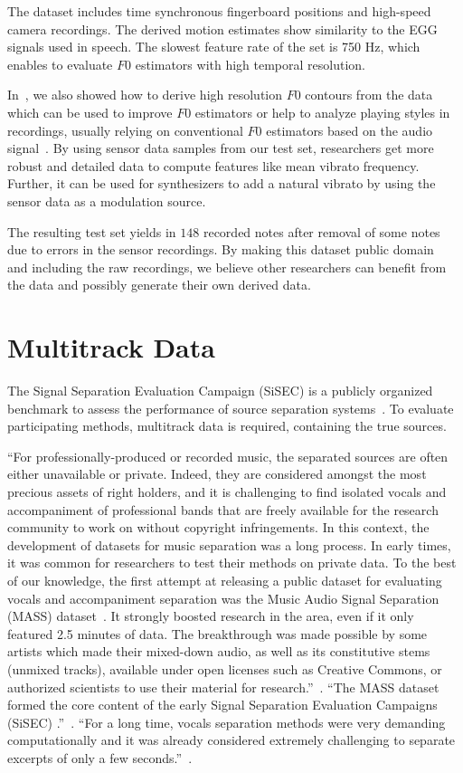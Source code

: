\par
The dataset includes time synchronous fingerboard positions and high-speed camera recordings. 
The derived motion estimates show similarity to the EGG signals used in speech. 
The slowest feature rate of the set is 750 Hz, which enables to evaluate $F0$ estimators with high temporal resolution. 
\par
In~\cite{stoeter15acm}, we also showed how to derive high resolution $F0$ contours from the data which can be used to improve $F0$ estimators or help to analyze playing styles in recordings, usually relying on conventional $F0$ estimators based on the audio signal~\cite{mellody2000time}. 
By using sensor data samples from our test set, researchers get more robust and detailed data to compute features like mean vibrato frequency. 
Further, it can be used for synthesizers to add a natural vibrato by using the sensor data as a modulation source.
\par
The resulting test set yields in $148$ recorded notes after removal of some notes due to errors in the sensor recordings.
By making this dataset public domain~\cite{oss_muserc} and including the raw recordings, we believe other researchers can benefit from the data and possibly generate their own derived data.

\section{Multitrack Data}%
\label{sec:multitrack}

The Signal Separation Evaluation Campaign (SiSEC) is a publicly organized benchmark to assess the performance of source separation systems~\cite{sisec13, ono15, liutkus17, stoeter18sisec}.
To evaluate participating methods, multitrack data is required, containing the true sources.

``For professionally-produced or recorded music, the separated sources are often either unavailable or private. Indeed, they are considered amongst the most precious assets of right holders, and it is challenging to find isolated vocals and accompaniment of professional bands that are freely available for the research community to work on without copyright infringements.
In this context, the development of datasets for music separation was a long process. 
In early times, it was common for researchers to test their methods on private data. 
To the best of our knowledge, the first attempt at releasing a public dataset for evaluating vocals and accompaniment separation was the Music Audio Signal Separation (MASS) dataset~\cite{MTGMASSdb}.
It strongly boosted research in the area, even if it only featured 2.5 minutes of data. The breakthrough was made possible by some artists which made their mixed-down audio, as well as its constitutive stems (unmixed tracks), available under open licenses such as Creative Commons, or authorized scientists to use their material for research.''~\cite{rafii}.
% 
``The MASS dataset formed the core content of the early Signal Separation Evaluation Campaigns (SiSEC) \cite{vincent09}.''~\cite{rafii}.
``For a long time, vocals separation methods were very demanding computationally and it was already considered extremely challenging to separate excerpts of only a few seconds.''~\cite{rafii}.

